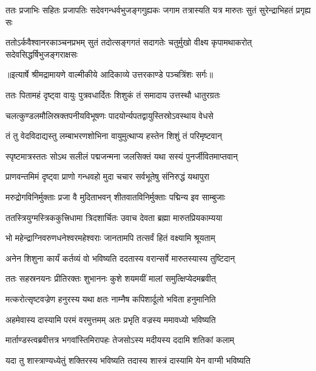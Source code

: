 \fourlineindentedshloka
{ततः प्रजाभिः सहितः प्रजापतिः}
{सदेवगन्धर्वभुजङ्गगुह्यकः}
{जगाम तत्रास्यति यत्र मारुतः}
{सुतं सुरेन्द्राभिहतं प्रगृह्य सः} %

\fourlineindentedshloka
{ततोऽर्कवैश्वानरकाञ्चनप्रभम्}
{सुतं तदोत्सङ्गगतं सदागतेः}
{चतुर्मुखो वीक्ष्य कृपामथाकरोत्}
{सदेवसिद्धर्षिभुजङ्गराक्षसः} %


{॥इत्यार्षे श्रीमद्रामायणे वाल्मीकीये आदिकाव्ये उत्तरकाण्डे पञ्चत्रिंशः सर्गः॥}


\twolineshloka
{ततः पितामहं दृष्ट्वा वायुः पुत्रवधार्दितः}
{शिशुकं तं समादाय उत्तस्थौ धातुरग्रतः} %

\twolineshloka
{चलत्कुण्डलमौलिस्रक्तपनीयविभूषणः}
{पादयोर्न्यपतद्वायुस्तिस्रोऽवस्थाय वेधसे} %

\twolineshloka
{तं तु वेदविदाद्यस्तु लम्बाभरणशोभिना}
{वायुमुत्थाप्य हस्तेन शिशुं तं परिमृष्टवान्} %

\twolineshloka
{स्पृष्टमात्रस्ततः सोऽथ सलीलं पद्मजन्मना}
{जलसिक्तं यथा सस्यं पुनर्जीवितमाप्तवान्} %

\twolineshloka
{प्राणवन्तमिमं दृष्ट्वा प्राणो गन्धवहो मुदा}
{चचार सर्वभूतेषु संनिरुद्धं यथापुरा} %

\twolineshloka
{मरुद्रोगविनिर्मुक्ताः प्रजा वै मुदिताभवन्}
{शीतवातविनिर्मुक्ताः पद्मिन्य इव साम्बुजाः} %

\twolineshloka
{ततस्त्रियुग्मस्त्रिककुत्त्रिधामा त्रिदशार्चितः}
{उवाच देवता ब्रह्मा मारुतप्रियकाम्यया} %

\twolineshloka
{भो महेन्द्राग्निवरुणधनेश्वरमहेश्वराः}
{जानतामपि तत्सर्वं हितं वक्ष्यामि श्रूयताम्} %

\twolineshloka
{अनेन शिशुना कार्यं कर्तव्यं वो भविष्यति}
{ददतास्य वरान्सर्वे मारुतस्यास्य तुष्टिदान्} %

\twolineshloka
{ततः सहस्रनयनः प्रीतिरक्तः शुभाननः}
{कुशे शयमयीं मालां समुत्क्षिप्येदमब्रवीत्} %

\twolineshloka
{मत्करोत्सृष्टवज्रेण हनुरस्य यथा क्षतः}
{नाम्नैष कपिशार्दूलो भविता हनुमानिति} %

\twolineshloka
{अहमेवास्य दास्यामि परमं वरमुत्तमम्}
{अतः प्रभृति वज्रस्य ममावध्यो भविष्यति} %

\twolineshloka
{मार्ताण्डस्त्वब्रवीत्तत्र भगवांस्तिमिरापहः}
{तेजसोऽस्य मदीयस्य ददामि शतिकां कलाम्} %

\twolineshloka
{यदा तु शास्त्राण्यध्येतुं शक्तिरस्य भविष्यति}
{तदास्य शास्त्रं दास्यामि येन वाग्मी भविष्यति} %

